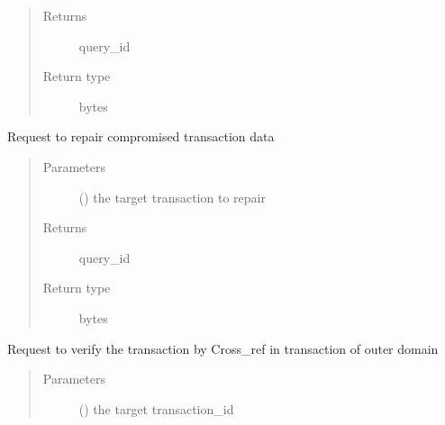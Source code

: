 \documentclass[letterpaper,10pt,english]{sphinxmanual}
\begin{document}
\begin{fulllineitems}
\begin{fulllineitems}
\begin{quote}
\begin{description}
\begin{itemize}
\end{itemize}

\item[{Returns}] \leavevmode
query\_id

\item[{Return type}] \leavevmode
bytes

\end{description}\end{quote}

\end{fulllineitems}


\begin{fulllineitems}
\label{\detokenize{bbc1.core.bbc_app:bbc1.core.bbc_app.BBcAppClient.request_to_repair_transaction}}
Request to repair compromised transaction data
\begin{quote}\begin{description}
\item[{Parameters}] \leavevmode
{} () \textendash{} the target transaction to repair

\item[{Returns}] \leavevmode
query\_id

\item[{Return type}] \leavevmode
bytes

\end{description}\end{quote}

\end{fulllineitems}


\begin{fulllineitems}
\label{\detokenize{bbc1.core.bbc_app:bbc1.core.bbc_app.BBcAppClient.request_verify_by_cross_ref}}
Request to verify the transaction by Cross\_ref in transaction of outer domain
\begin{quote}\begin{description}
\item[{Parameters}] \leavevmode
{} () \textendash{} the target transaction\_id


\end{description}
\end{quote}
\end{fulllineitems}
\end{fulllineitems}
\end{document}
